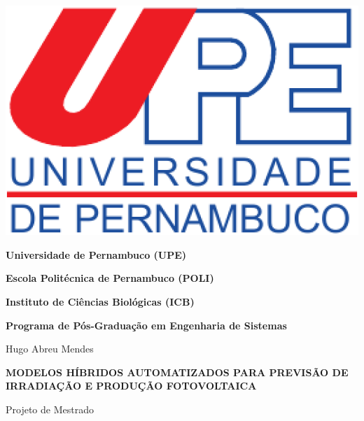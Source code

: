 \begin{center}
\begin{minipage}[b]{0.15\linewidth}
\end{minipage} \hfill
\begin{minipage}[b]{0.15\linewidth}
\includegraphics[width=\textwidth]{Figuras/Capa/upelogo.eps}
\end{minipage}


{\textbf{Universidade de Pernambuco (UPE)}} %

{\textbf{Escola Politécnica de Pernambuco (POLI)}} %

{\textbf{Instituto de Ciências Biológicas (ICB)}} \\ \vspace{1ex}

{\textbf{Programa de Pós-Graduação em Engenharia de Sistemas}} \\ \vspace{1ex}

\vspace{1.0in}

{\Large Hugo Abreu Mendes}

\vspace{1.3in}

{\Large \textbf{MODELOS HÍBRIDOS AUTOMATIZADOS PARA PREVISÃO DE IRRADIAÇÃO E PRODUÇÃO FOTOVOLTAICA}} \\

\vspace{1.4in}

{\large Projeto de Mestrado}

\vspace{1.6in}


\vspace{18pt}{Recife, Março de 2021.}

\end{center}